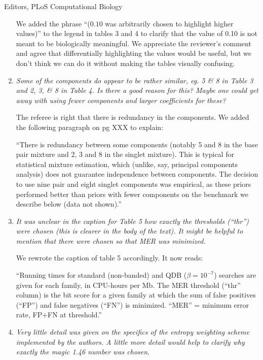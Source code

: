 \documentclass{jfrcletter}
\begin{document}
\begin{letter}{Editors, PLoS Computational Biology}
\begin{enumerate}
   We added the phrase ``($0.10$ was arbitrarily chosen to highlight
   higher values)'' to the legend in tables 3 and 4 to clarify that the
   value of 0.10 is not meant to be biologically meaningful.  We
   appreciate the reviewer's comment and agree that differentially
   highlighting the values would be useful, but we don't think we can
   do it without making the tables visually confusing.

\item \emph{\footnotesize Some of the components do appear to be rather similar,
   eg. 5 \& 8 in Table 3 and 2, 3, \& 8 in Table 4. Is there a good
   reason for this? Maybe one could get away with using fewer
   components and larger coefficients for these? }

   The referee is right that there is redundancy in the components.
   We added the following paragraph on pg XXX to explain:

   ``There is redundancy between some components (notably 5
   and 8 in the base pair mixture and 2, 3 and 8 in the singlet
   mixture). This is typical for statistical mixture estimation, which
   (unlike, say, principal components analysis) does not guarantee
   independence between components. The decision to use nine pair
   and eight singlet components was empirical, as these priors
   performed better than priors with fewer components on the benchmark
   we describe below (data not shown).''

\item \emph{\footnotesize It was unclear in the caption for Table 5 how exactly the
   thresholds (``thr'') were chosen (this is clearer in the body of the
   text). It might be helpful to mention that there were chosen so
   that MER was minimized.}

   We rewrote the caption of table 5 accordingly. It now reads:

   ``Running times for standard (non-banded) and QDB ($\beta=10^{-7}$)
   searches are given for each family, in CPU-hours per Mb.  The MER
   threshold (``thr'' column) is the bit score for a given family at
   which the sum of false positives (``FP'') and false negatives
   (``FN'') is minimized. ``MER'' = minimum error rate, FP+FN at
   threshold.''

\item \emph{\footnotesize Very little detail was given on the specifics of the
   entropy weighting scheme implemented by the authors. A little more
   detail would help to clarify why exactly the magic 1.46 number was
   chosen.}


\end{enumerate}
\end{letter}
\end{document}
